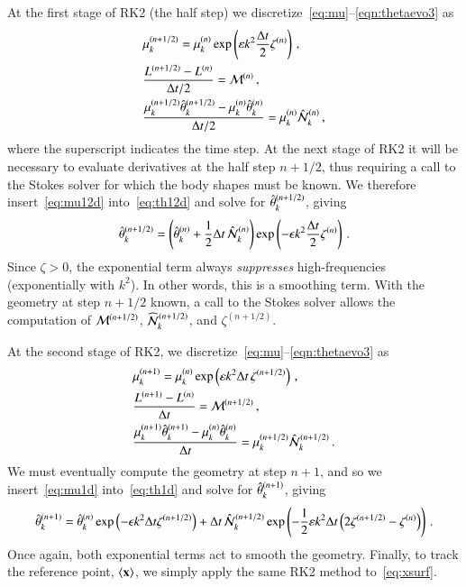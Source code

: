 \documentclass[preprint, 10pt]{elsarticle}
\begin{document}
At the first stage of RK2 (the half step) we discretize~\eqref{eq:mu}--\eqref{eqn:thetaevo3} as
\begin{align}
\label{eq:mu12d}
& \mu_k^{(n+1/2)} = \mu_k^{(n)} \exp \left( \varepsilon k^2 \frac{\Delta t}{2}
\zeta^{(n)} \right) \, , \\
\label{eq:L12d}
& \frac{L^{(n+1/2)} - L^{(n)}}{\Delta t/2} = \mathcal{M}^{(n)} \, , \\
\label{eq:th12d}
& \frac{ \mu_k^{(n+1/2)} \hat{\theta}_k^{(n+1/2)} - \mu_k^{(n)} \hat{\theta}_k^{(n)}}{\Delta t/2} 
= \mu_k^{(n)} \hat{\mathcal{N}}_k^{(n)} \, ,
\end{align}
where the superscript indicates the time step. At the next stage of RK2 it will be necessary to evaluate derivatives at the half step $n+1/2$, thus requiring a call to the Stokes solver for which the body shapes must be known. We therefore insert~\eqref{eq:mu12d} into~\eqref{eq:th12d} and solve for $\hat{\theta}_k^{(n+1/2)}$, giving
\begin{align}
\label{eq:th12}
\hat{\theta}_k^{(n+1/2)} = \left( \hat{\theta}_k^{(n)} + \frac{1}{2} \Delta t \, \hat{\mathcal{N}}_k^{(n)} \right)
\exp \left( -\epsilon k^2 \frac{\Delta t}{2} \zeta^{(n)}\right) \, .
\end{align}
Since $\zeta >0$, the exponential term always {\em suppresses} high-frequencies (exponentially with $k^2$). In other words, this is a smoothing term. With the geometry at step $n+1/2$ known, a call to the Stokes solver allows the computation of $\mathcal{M}^{(n+1/2)}$, $\widehat{\NLterm}_k^{(n+1/2)}$, and $\zeta^{(n+1/2)}$.

At the second stage of RK2, we discretize~\eqref{eq:mu}--\eqref{eqn:thetaevo3} as 
\begin{align}
\label{eq:mu1d}
& \mu_k^{(n+1)} = \mu_k^{(n)} \exp \left( \varepsilon k^2 {\Delta t} \,
\zeta^{(n+1/2)} \right) \, , \\
\label{eq:L1d}
& \frac{L^{(n+1)} - L^{(n)}}{\Delta t} = \mathcal{M}^{(n+1/2)} \, , \\
\label{eq:th1d}
& \frac{ \mu_k^{(n+1)} \hat{\theta}_k^{(n+1)} - \mu_k^{(n)} \hat{\theta}_k^{(n)}}{\Delta t} =
\mu_k^{(n+1/2)} \hat{\mathcal{N}}_k^{(n+1/2)} \, .
\end{align}
We must eventually compute the geometry at step $n+1$, and so we insert~\eqref{eq:mu1d} into~\eqref{eq:th1d} and solve for $\hat{\theta}_k^{(n+1)}$, giving
\begin{align}
\hat{\theta}_k^{(n+1)} =  \hat{\theta}_k^{(n)} \exp \left( - \epsilon k^2 \Delta t
\zeta^{(n+1/2)} \right) + \Delta t \, \hat{\mathcal{N}}_k^{(n+1/2)} \exp \left(
- \frac{1}{2} \varepsilon k^2 \Delta t \left( 2 \zeta^{(n+1/2)} - \zeta^{(n)}
\right) \right) \, .
\end{align}
Once again, both exponential terms act to smooth the geometry. Finally, to track the reference point, $\left< {\mathbf{x}} \right>$, we simply apply the same RK2 method to~\eqref{eq:xsurf}.
\end{document}
